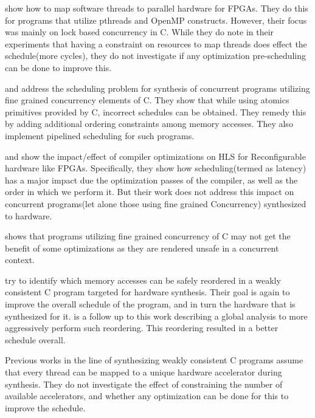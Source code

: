 \documentclass[sigplan,10pt,review]{acmart}
\begin{document}
        \cite{DBLP:conf/fpt/ChoiBA13} show how to map software threads to parallel hardware for FPGAs. 
        They do this for programs that utilize pthreads and OpenMP constructs.
        However, their focus was mainly on lock based concurrency in C. 
        While they do note in their experiments that having a constraint on resources to map threads does effect the schedule(more cycles), they do not investigate if any optimization pre-scheduling can be done to improve this. 

        \cite{DBLP:conf/fpga/RamanathanFWC17} and \cite{DBLP:journals/tc/RamanathanWC18} address the scheduling problem for synthesis of concurrent programs utilizing fine grained concurrency elements of C.
        They show that while using atomics primitives provided by C, incorrect schedules can be obtained.
        They remedy this by adding additional ordering constraints among memory accesses.
        They also implement pipelined scheduling for such programs.

        \cite{DBLP:conf/lcpc/CongLPZ12} and \cite{DBLP:conf/fccm/HuangLCCXBA13} show the impact/effect of compiler optimizations on HLS for Reconfigurable hardware like FPGAs.
        Specifically, they show how scheduling(termed as latency) has a major impact due the optimization passes of the compiler, as well as the order in which we perform it. 
        But their work does not address this impact on concurrent programs(let alone those using fine grained Concurrency) synthesized to hardware. 

        \cite{DBLP:conf/popl/VafeiadisBCMN15} shows that programs utilizing fine grained concurrency of C may not get the benefit of some optimizations as they are rendered unsafe in a concurrent context. 
        
        \cite{DBLP:conf/fccm/RamanathanCW18} try to identify which memory accesses can be safely reordered in a weakly consistent C program targeted for hardware synthesis.
        Their goal is again to improve the overall schedule of the program, and in turn the hardware that is synthesized for it. 
        \cite{DBLP:journals/tvlsi/RamanathanCW21} is a follow up to this work describing a global analysis to more aggressively perform such reordering.
        This reordering resulted in a better schedule overall.

        Previous works in the line of synthesizing weakly consistent C programs assume that every thread can be mapped to a unique hardware accelerator during synthesis. 
        They do not investigate the effect of constraining the number of available accelerators, and whether any optimization can be done for this to improve the schedule.
\end{document}
